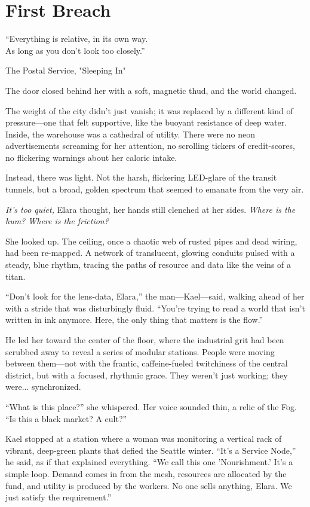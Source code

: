 
\chapter{First Breach}
\epigraph{``Everything is relative, in its own way.\\As long as you don't look too closely.''}{The Postal Service, "Sleeping In"}

The door closed behind her with a soft, magnetic thud, and the world changed. 

The weight of the city didn't just vanish; it was replaced by a different kind of pressure—one that felt supportive, like the buoyant resistance of deep water. Inside, the warehouse was a cathedral of utility. There were no neon advertisements screaming for her attention, no scrolling tickers of credit-scores, no flickering warnings about her caloric intake. 

Instead, there was light. Not the harsh, flickering LED-glare of the transit tunnels, but a broad, golden spectrum that seemed to emanate from the very air. 

\textit{It’s too quiet,} Elara thought, her hands still clenched at her sides. \textit{Where is the hum? Where is the friction?}

She looked up. The ceiling, once a chaotic web of rusted pipes and dead wiring, had been re-mapped. A network of translucent, glowing conduits pulsed with a steady, blue rhythm, tracing the paths of resource and data like the veins of a titan. 

``Don't look for the lens-data, Elara,'' the man—Kael—said, walking ahead of her with a stride that was disturbingly fluid. ``You’re trying to read a world that isn't written in ink anymore. Here, the only thing that matters is the flow.''

He led her toward the center of the floor, where the industrial grit had been scrubbed away to reveal a series of modular stations. People were moving between them—not with the frantic, caffeine-fueled twitchiness of the central district, but with a focused, rhythmic grace. They weren't just working; they were... synchronized.



``What is this place?'' she whispered. Her voice sounded thin, a relic of the Fog. ``Is this a black market? A cult?''

Kael stopped at a station where a woman was monitoring a vertical rack of vibrant, deep-green plants that defied the Seattle winter. ``It’s a Service Node,'' he said, as if that explained everything. ``We call this one 'Nourishment.' It’s a simple loop. Demand comes in from the mesh, resources are allocated by the fund, and utility is produced by the workers. No one sells anything, Elara. We just satisfy the requirement.''

